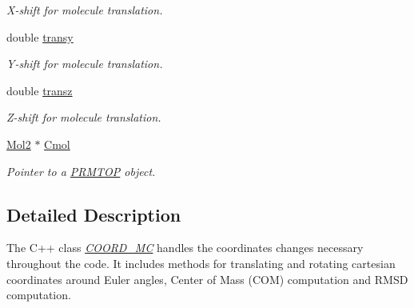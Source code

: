 \begin{DoxyCompactItemize}
\begin{DoxyCompactList}\small\item\em X-\/shift for molecule translation. \item\end{DoxyCompactList}\item 
\hypertarget{classCOORD__MC_abcea4fc50769038aa68487317f07d208}{
double \hyperlink{classCOORD__MC_abcea4fc50769038aa68487317f07d208}{transy}}
\label{classCOORD__MC_abcea4fc50769038aa68487317f07d208}

\begin{DoxyCompactList}\small\item\em Y-\/shift for molecule translation. \item\end{DoxyCompactList}\item 
\hypertarget{classCOORD__MC_ae6a278f635288d901a8d00a512ab481b}{
double \hyperlink{classCOORD__MC_ae6a278f635288d901a8d00a512ab481b}{transz}}
\label{classCOORD__MC_ae6a278f635288d901a8d00a512ab481b}

\begin{DoxyCompactList}\small\item\em Z-\/shift for molecule translation. \item\end{DoxyCompactList}\item 
\hypertarget{classCOORD__MC_abdacaab2b3fca9018229d3ec220cf39d}{
\hyperlink{classMol2}{Mol2} $\ast$ \hyperlink{classCOORD__MC_abdacaab2b3fca9018229d3ec220cf39d}{Cmol}}
\label{classCOORD__MC_abdacaab2b3fca9018229d3ec220cf39d}

\begin{DoxyCompactList}\small\item\em Pointer to a \hyperlink{classPRMTOP}{PRMTOP} object. \item\end{DoxyCompactList}\end{DoxyCompactItemize}


\subsection{Detailed Description}
The C++ class {\itshape \hyperlink{classCOORD__MC}{COORD\_\-MC}\/} handles the coordinates changes necessary throughout the code. It includes methods for translating and rotating cartesian coordinates around Euler angles, Center of Mass (COM) computation and RMSD computation. 

